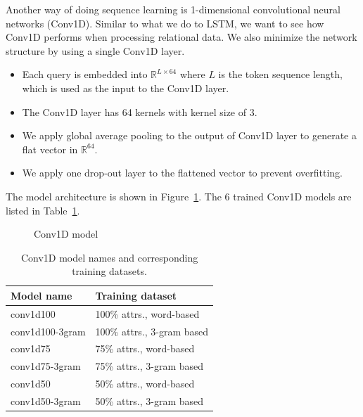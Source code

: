 
Another way of doing sequence learning is 1-dimensional convolutional neural networks (Conv1D). Similar to what we do to LSTM, we want to see how Conv1D performs when processing relational data. We also minimize the network structure by using a single Conv1D layer.


\begin{itemize}
	\item Each query is embedded into $\mathbb{R}^{L\times 64}$ where $L$ is the token sequence length, which is used as the input to the Conv1D layer.
	\item The Conv1D layer has 64 kernels with kernel size of 3.
	\item We apply global average pooling to the output of Conv1D layer to generate a flat vector in $\mathbb{R}^{64}$.
	\item We apply one drop-out layer to the flattened vector to prevent overfitting.
\end{itemize}

The model architecture is shown in Figure~\ref{fig:conv1d_model}. The 6 trained Conv1D models are listed in Table~\ref{tab:trained_conv1d_models}.
\begin{figure}[!th]
	\centering
	
	\caption{Conv1D model}
	\label{fig:conv1d_model}
\end{figure}
\begin{table}[!th]
	\centering
	\begin{tabularx}{0.8\textwidth}{|l|X|}
		\hline
		\textbf{Model name} & \textbf{Training dataset} \\ \hline
		conv1d100 & 100\% attrs., word-based \\
		conv1d100-3gram & 100\% attrs., 3-gram based \\ 
		conv1d75 & 75\% attrs., word-based \\
		conv1d75-3gram & 75\% attrs., 3-gram based \\ 
		conv1d50 & 50\% attrs., word-based \\
		conv1d50-3gram & 50\% attrs., 3-gram based \\ 
		\hline
	\end{tabularx}
	\caption{Conv1D model names and corresponding training datasets.}
	\label{tab:trained_conv1d_models}
\end{table}

